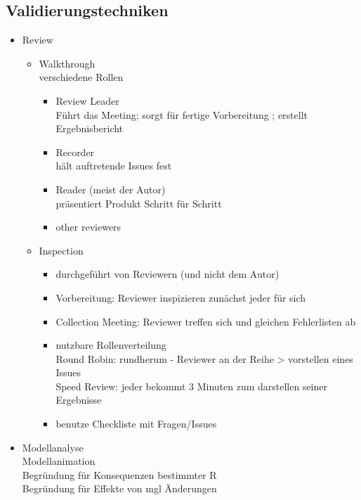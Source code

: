 \subsection{Validierungstechniken}
\begin{itemize}
	\item Review
	\begin{itemize}
		\item Walkthrough\\
		verschiedene Rollen
		\begin{itemize}
			\item Review Leader\\
			Führt das Meeting; sorgt für fertige Vorbereitung ; erstellt Ergebnisbericht
			
			\item Recorder\\
			hält auftretende Issues fest
			
			\item Reader (meist der Autor)\\
			präsentiert Produkt Schritt für Schritt
			
			\item other reviewers
		\end{itemize}
		
		\item Inspection
		\begin{itemize}
			\item durchgeführt von Reviewern (und nicht dem Autor) 
			
			\item Vorbereitung: Reviewer inspizieren zunächst jeder für sich
			
			\item Collection Meeting: Reviewer treffen sich und gleichen Fehlerlisten ab
			
			\item nutzbare Rollenverteilung\\
			Round Robin: rundherum - Reviewer an der Reihe > vorstellen eines Issues\\
			Speed Review: jeder bekommt 3 Minuten zum darstellen seiner Ergebnisse
			
			\item benutze Checkliste mit Fragen/Issues
		\end{itemize}
	\end{itemize}
	
	\item Modellanalyse\\
	Modellanimation\\
	Begründung für Konsequenzen bestimmter R\\
	Begründung für Effekte von mgl Änderungen
	

\end{itemize}
